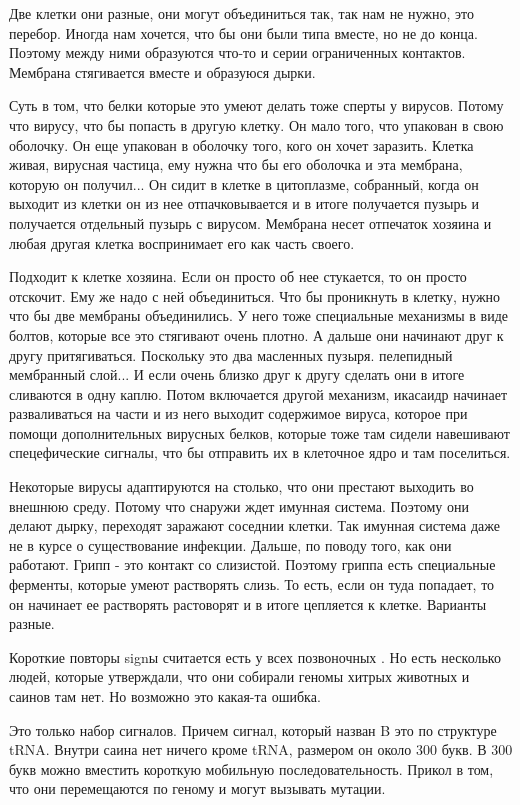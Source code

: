 Две клетки они разные, они могут объединиться так, так нам не нужно, 
это перебор. Иногда нам хочется, что бы 
они были типа вместе, но не до конца. Поэтому между  ними образуются 
что-то и серии ограниченных контактов. Мембрана стягивается 
вместе и образуюся дырки. 

Суть в том, что белки которые это умеют делать тоже сперты у вирусов. 
Потому что вирусу, что бы попасть в другую клетку. Он мало того, что 
упакован в свою оболочку. Он еще упакован в оболочку того, кого он хочет заразить. 
Клетка живая, вирусная частица, ему нужна что бы его оболочка и эта мембрана, 
которую он получил... Он сидит в клетке в цитоплазме, 
собранный, когда он выходит из клетки он из нее отпачковывается и 
в итоге получается пузырь и получается отдельный пузырь с вирусом. Мембрана несет отпечаток
хозяина и любая другая клетка воспринимает его как 
часть своего. 

Подходит к клетке хозяина. Если он просто об нее стукается, то он просто отскочит. Ему же
надо с ней объединиться. Что бы проникнуть в клетку, нужно что бы 
две мембраны объединились. У него тоже специальные механизмы в виде болтов, 
которые все это стягивают очень плотно. А дальше они начинают друг к другу притягиваться. 
Поскольку это два масленных пузыря. пелепидный мембранный слой... И если очень близко 
друг к другу сделать они в итоге сливаются в одну каплю. Потом включается 
другой механизм, икасаидр начинает 
разваливаться на части и из него выходит содержимое вируса, которое при помощи 
дополнительных вирусных 
белков, которые тоже там сидели навешивают спецефические сигналы, что 
бы отправить их в клеточное ядро и там поселиться. 

Некоторые вирусы адаптируются на столько, что они престают выходить во внешнюю
среду. Потому что снаружи ждет имунная система. Поэтому они делают дырку, переходят 
заражают соседнии клетки. Так имунная система даже не в курсе о существование инфекции. 
Дальше, по поводу того, как они работают. Грипп - это контакт со слизистой. Поэтому 
гриппа есть специальные ферменты, которые умеют растворять слизь. То есть, если 
он туда попадает, то он начинает ее растворять растоворят и в итоге цепляется к клетке. 
Варианты разные. 

Короткие повторы signы считается есть у всех позвоночных . Но есть несколько людей, 
которые утверждали, что они собирали геномы хитрых животных и саинов там нет. Но возможно это 
какая-та ошибка. 

Это только набор сигналов. Причем сигнал, который назван B это по структуре tRNA. Внутри саина нет
ничего кроме tRNA, размером он около 300 букв. В 300 букв можно вместить короткую
мобильную последовательность. Прикол в том, что они перемещаются по геному и могут вызывать мутации.

